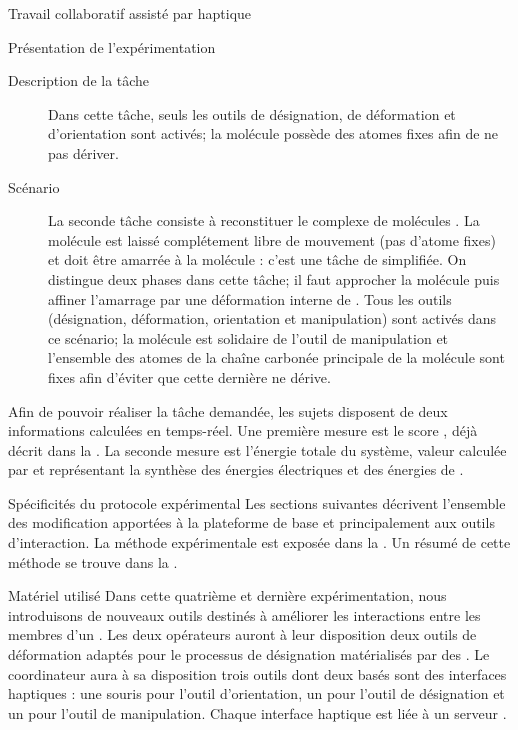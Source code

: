 \documentclass[myfrancais,ngerman,english,french]{mythesis}
\begin{document}
\begin{mychapter}{Travail collaboratif assisté par haptique}
\begin{mysection}{Présentation de l'expérimentation}
\begin{mysubsection}{Description de la tâche}
\begin{description}
						Dans cette tâche, seuls les outils de désignation, de déformation et d'orientation sont activés; la molécule \myUbiquitin possède des atomes fixes afin de ne pas dériver.
					\item[Scénario~\myscenario{2}]
						La seconde tâche consiste à reconstituer le complexe de molécules \myNusENusG.
						La molécule \myNusG est laissé complétement libre de mouvement (pas d'atome fixes) et doit être amarrée à la molécule \myNusE : c'est une tâche de  simplifiée.
						On distingue deux phases dans cette tâche; il faut approcher la molécule \myNusG puis affiner l'amarrage par une déformation interne de \myNusG.
						Tous les outils (désignation, déformation, orientation et manipulation) sont activés dans ce scénario; la molécule \myNusG est solidaire de l'outil de manipulation et l'ensemble des atomes de la chaîne carbonée principale de la molécule \myNusE sont fixes afin d'éviter que cette dernière ne dérive.
				\end{description}

				Afin de pouvoir réaliser la tâche demandée, les sujets disposent de deux informations calculées en temps-réel.
				Une première mesure est le score , déjà décrit dans la .
				La seconde mesure est l'énergie totale du système, valeur calculée par  et représentant la synthèse des énergies électriques et des énergies de .
			\end{mysubsection}
			\begin{mysubsection}{Spécificités du protocole expérimental}
				Les sections suivantes décrivent l'ensemble des modification apportées à la plateforme de base  et principalement aux outils d'interaction.
				La méthode expérimentale est exposée dans la .
				Un résumé de cette méthode se trouve dans la .
				\begin{mysubsubsection}{Matériel utilisé}
					Dans cette quatrième et dernière expérimentation, nous introduisons de nouveaux outils destinés à améliorer les interactions entre les membres d'un .
					Les deux opérateurs auront à leur disposition deux outils de déformation adaptés pour le processus de désignation  matérialisés par des \myOmni.
					Le coordinateur aura à sa disposition trois outils dont deux basés sont des interfaces haptiques : une souris \myUSB pour l'outil d'orientation, un \myOmni pour l'outil de désignation et un \myDesktop pour l'outil de manipulation.
					Chaque interface haptique est liée à un serveur .


\end{mysubsubsection}
\end{mysubsection}
\end{mysection}
\end{mychapter}
\end{document}
